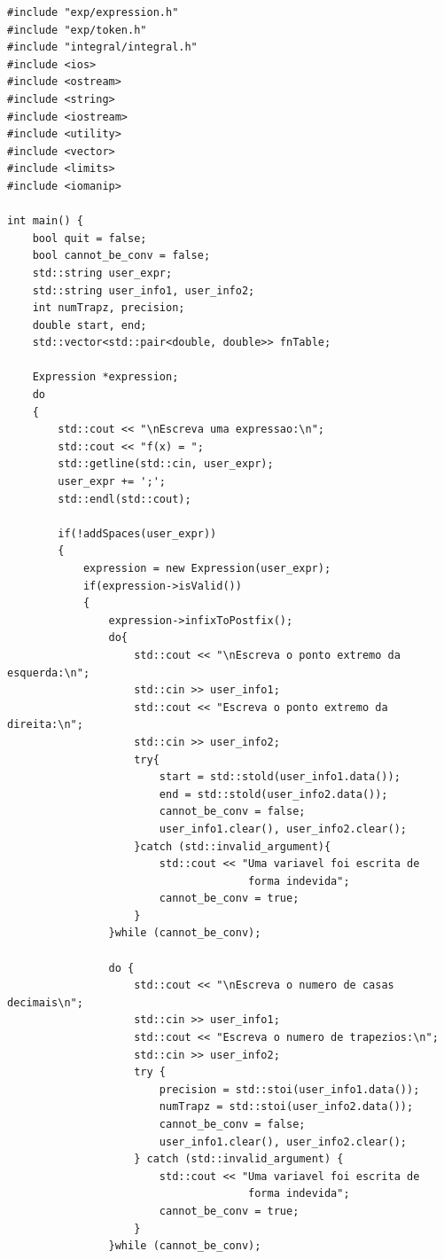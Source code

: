 \documentclass[14pt, letterpaper]{article}
\begin{document}
\begin{lstlisting}[caption=main.cpp]
#include "exp/expression.h"
#include "exp/token.h"
#include "integral/integral.h"
#include <ios>
#include <ostream>
#include <string>
#include <iostream>
#include <utility>
#include <vector>
#include <limits>
#include <iomanip>

int main() {
    bool quit = false;
    bool cannot_be_conv = false;
    std::string user_expr;
    std::string user_info1, user_info2;
    int numTrapz, precision;
    double start, end;
    std::vector<std::pair<double, double>> fnTable;

    Expression *expression;
    do
    {
        std::cout << "\nEscreva uma expressao:\n";
        std::cout << "f(x) = ";
        std::getline(std::cin, user_expr);
        user_expr += ';';
        std::endl(std::cout);

        if(!addSpaces(user_expr))
        {
            expression = new Expression(user_expr);
            if(expression->isValid())
            {
                expression->infixToPostfix();
                do{
                    std::cout << "\nEscreva o ponto extremo da esquerda:\n";
                    std::cin >> user_info1; 
                    std::cout << "Escreva o ponto extremo da direita:\n";
                    std::cin >> user_info2; 
                    try{
                        start = std::stold(user_info1.data()); 
                        end = std::stold(user_info2.data()); 
                        cannot_be_conv = false;
                        user_info1.clear(), user_info2.clear();
                    }catch (std::invalid_argument){
                        std::cout << "Uma variavel foi escrita de 
                                      forma indevida";
                        cannot_be_conv = true;                    
                    }
                }while (cannot_be_conv);

                do {
                    std::cout << "\nEscreva o numero de casas decimais\n"; 
                    std::cin >> user_info1; 
                    std::cout << "Escreva o numero de trapezios:\n";
                    std::cin >> user_info2; 
                    try {
                        precision = std::stoi(user_info1.data());
                        numTrapz = std::stoi(user_info2.data());
                        cannot_be_conv = false;                    
                        user_info1.clear(), user_info2.clear();
                    } catch (std::invalid_argument) {
                        std::cout << "Uma variavel foi escrita de 
                                      forma indevida";
                        cannot_be_conv = true;
                    }
                }while (cannot_be_conv);


\end{lstlisting}
\end{document}
